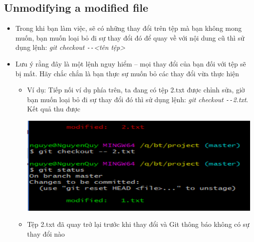 \documentclass[12pt,a4paper]{report}
\begin{document}
\subsection{Unmodifying a modified file}
\begin{itemize}
\item Trong khi bạn làm việc, sẽ có những thay đổi trên tệp mà bạn không mong muốn, bạn muốn loại bỏ đi sự thay đổi đó để quay về với nội dung cũ thì sử dụng lệnh: {\it git checkout \texttt{-{}-}<tên tệp>}\vskip 0.4cm
\item Lưu ý rằng đây là một lệnh nguy hiểm – mọi thay đổi của bạn đối với tệp sẽ bị mất. Hãy chắc chắn là bạn thực sự muốn bỏ các thay đổi vừa thực hiện
	\begin{itemize}
\item Ví dụ: Tiếp nối ví dụ phía trên, ta đang có tệp 2.txt được chỉnh sửa, giờ bạn muốn loại bỏ đi sự thay đổi đó thì sử dụng lệnh: {\it git checkout \texttt{-{}-}2.txt}. Kết quả thu được

	\includegraphics[width=0.8\linewidth]{screenshot031}

	\label{fig:screenshot031}

\item Tệp 2.txt đã quay trở lại trước khi thay đổi và Git thông báo không có sự thay đổi nào
\end{itemize}\end{itemize}



\newpage
\end{document}
